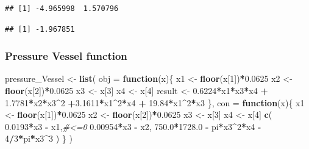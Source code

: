 \documentclass[]{ctexbook}
\newenvironment{Shaded}{\begin{snugshade}}{\end{snugshade}}
\newcommand{\KeywordTok}[1]{\textcolor[rgb]{0.13,0.29,0.53}{\textbf{#1}}}
\newcommand{\DataTypeTok}[1]{\textcolor[rgb]{0.13,0.29,0.53}{#1}}
\newcommand{\DecValTok}[1]{\textcolor[rgb]{0.00,0.00,0.81}{#1}}
\newcommand{\FloatTok}[1]{\textcolor[rgb]{0.00,0.00,0.81}{#1}}
\newcommand{\StringTok}[1]{\textcolor[rgb]{0.31,0.60,0.02}{#1}}
\newcommand{\CommentTok}[1]{\textcolor[rgb]{0.56,0.35,0.01}{\textit{#1}}}
\newcommand{\ControlFlowTok}[1]{\textcolor[rgb]{0.13,0.29,0.53}{\textbf{#1}}}
\newcommand{\OperatorTok}[1]{\textcolor[rgb]{0.81,0.36,0.00}{\textbf{#1}}}
\newcommand{\NormalTok}[1]{#1}
\theoremstyle{definition}
\theoremstyle{definition}
\theoremstyle{definition}
\theoremstyle{remark}
\begin{document}
\begin{verbatim}
## [1] -4.965998  1.570796
\end{verbatim}

\begin{verbatim}
## [1] -1.967851
\end{verbatim}

\subsubsection{Pressure Vessel function}\label{pressure-vessel-function}

\begin{Shaded}
\begin{Highlighting}[]
\NormalTok{pressure_Vessel <-}\StringTok{ }\KeywordTok{list}\NormalTok{(}
\DataTypeTok{obj =} \ControlFlowTok{function}\NormalTok{(x)\{}
\NormalTok{  x1 <-}\StringTok{ }\KeywordTok{floor}\NormalTok{(x[}\DecValTok{1}\NormalTok{])}\OperatorTok{*}\FloatTok{0.0625}
\NormalTok{  x2 <-}\StringTok{ }\KeywordTok{floor}\NormalTok{(x[}\DecValTok{2}\NormalTok{])}\OperatorTok{*}\FloatTok{0.0625}
\NormalTok{  x3 <-}\StringTok{ }\NormalTok{x[}\DecValTok{3}\NormalTok{]}
\NormalTok{  x4 <-}\StringTok{ }\NormalTok{x[}\DecValTok{4}\NormalTok{]}
\NormalTok{  result <-}\StringTok{ }\FloatTok{0.6224}\OperatorTok{*}\NormalTok{x1}\OperatorTok{*}\NormalTok{x3}\OperatorTok{*}\NormalTok{x4 }\OperatorTok{+}\StringTok{ }\FloatTok{1.7781}\OperatorTok{*}\NormalTok{x2}\OperatorTok{*}\NormalTok{x3}\OperatorTok{^}\DecValTok{2} \OperatorTok{+}\FloatTok{3.1611}\OperatorTok{*}\NormalTok{x1}\OperatorTok{^}\DecValTok{2}\OperatorTok{*}\NormalTok{x4 }\OperatorTok{+}\StringTok{ }\FloatTok{19.84}\OperatorTok{*}\NormalTok{x1}\OperatorTok{^}\DecValTok{2}\OperatorTok{*}\NormalTok{x3}
\NormalTok{\},}
\DataTypeTok{con =} \ControlFlowTok{function}\NormalTok{(x)\{}
\NormalTok{  x1 <-}\StringTok{ }\KeywordTok{floor}\NormalTok{(x[}\DecValTok{1}\NormalTok{])}\OperatorTok{*}\FloatTok{0.0625}
\NormalTok{  x2 <-}\StringTok{ }\KeywordTok{floor}\NormalTok{(x[}\DecValTok{2}\NormalTok{])}\OperatorTok{*}\FloatTok{0.0625}
\NormalTok{  x3 <-}\StringTok{ }\NormalTok{x[}\DecValTok{3}\NormalTok{]}
\NormalTok{  x4 <-}\StringTok{ }\NormalTok{x[}\DecValTok{4}\NormalTok{]}
  \KeywordTok{c}\NormalTok{(}
    \FloatTok{0.0193}\OperatorTok{*}\NormalTok{x3 }\OperatorTok{-}\StringTok{ }\NormalTok{x1,}\CommentTok{#<=0}
    \FloatTok{0.00954}\OperatorTok{*}\NormalTok{x3 }\OperatorTok{-}\StringTok{ }\NormalTok{x2,}
    \FloatTok{750.0}\OperatorTok{*}\FloatTok{1728.0} \OperatorTok{-}\StringTok{ }\NormalTok{pi}\OperatorTok{*}\NormalTok{x3}\OperatorTok{^}\DecValTok{2}\OperatorTok{*}\NormalTok{x4 }\OperatorTok{-}\StringTok{ }\DecValTok{4}\OperatorTok{/}\DecValTok{3}\OperatorTok{*}\NormalTok{pi}\OperatorTok{*}\NormalTok{x3}\OperatorTok{^}\DecValTok{3}
\NormalTok{  )}
\NormalTok{\}}
\NormalTok{)}
\end{Highlighting}
\end{Shaded}
\end{document}
